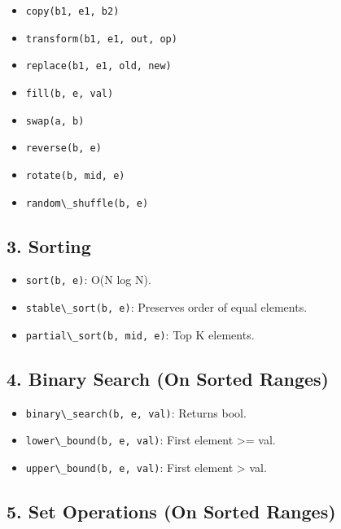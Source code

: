 \begin{itemize}
\tightlist
\item
  \passthrough{\lstinline!copy(b1, e1, b2)!}
\item
  \passthrough{\lstinline!transform(b1, e1, out, op)!}
\item
  \passthrough{\lstinline!replace(b1, e1, old, new)!}
\item
  \passthrough{\lstinline!fill(b, e, val)!}
\item
  \passthrough{\lstinline!swap(a, b)!}
\item
  \passthrough{\lstinline!reverse(b, e)!}
\item
  \passthrough{\lstinline!rotate(b, mid, e)!}
\item
  \passthrough{\lstinline!random\_shuffle(b, e)!}
\end{itemize}

\hypertarget{sorting}{%
\subsection{3. Sorting}\label{sorting}}

\begin{itemize}
\tightlist
\item
  \passthrough{\lstinline!sort(b, e)!}: O(N log N).
\item
  \passthrough{\lstinline!stable\_sort(b, e)!}: Preserves order of equal
  elements.
\item
  \passthrough{\lstinline!partial\_sort(b, mid, e)!}: Top K elements.
\end{itemize}

\hypertarget{binary-search-on-sorted-ranges}{%
\subsection{4. Binary Search (On Sorted
Ranges)}\label{binary-search-on-sorted-ranges}}

\begin{itemize}
\tightlist
\item
  \passthrough{\lstinline!binary\_search(b, e, val)!}: Returns bool.
\item
  \passthrough{\lstinline!lower\_bound(b, e, val)!}: First element
  \textgreater= val.
\item
  \passthrough{\lstinline!upper\_bound(b, e, val)!}: First element
  \textgreater{} val.
\end{itemize}

\hypertarget{set-operations-on-sorted-ranges}{%
\subsection{5. Set Operations (On Sorted
Ranges)}\label{set-operations-on-sorted-ranges}}


